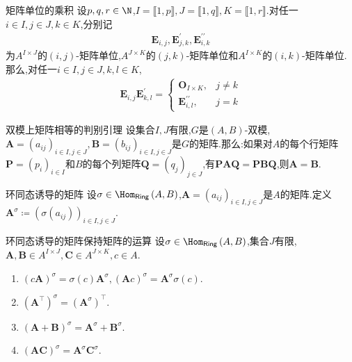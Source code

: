 \begin{proposition}{矩阵单位的乘积}{}
	设$p,q,r\in\N$,$I=\llbracket 1,p\rrbracket,J=\llbracket 1,q\rrbracket,K=\llbracket 1,r\rrbracket$.对任一$i\in I,j\in J,k\in K$,分别记
	\begin{align*}
		\boldsymbol{E}_{i,j},\boldsymbol{E}_{j,k}^{\prime},\boldsymbol{E}_{i,k}^{\prime\prime}
	\end{align*}
	为$A^{I\times J}$的$\left(i,j\right)$-矩阵单位,$A^{J\times K}$的$\left(j,k\right)$-矩阵单位和$A^{I\times K}$的$\left(i,k\right)$-矩阵单位.那么,对任一$i\in I,j\in J,k,l\in K$,
	\begin{align*}
		\boldsymbol{E}_{i,j}\boldsymbol{E}_{k,l}^{\prime}=
		\begin{cases}
			\boldsymbol{O}_{I\times K},&j\neq k\\
			\boldsymbol{E}_{i,l}^{\prime\prime},&j=k
		\end{cases}
	\end{align*}
\end{proposition}

\begin{proposition}{双模上矩阵相等的判别引理}{}
	设集合$I,J$有限,$G$是$\left(A,B\right)$-双模,$\boldsymbol{A}=\left(a_{ij}\right)_{i\in I,j\in J},\boldsymbol{B}=\left(b_{ij}\right)_{i\in I,j\in J}$是$G$的矩阵.那么:如果对$A$的每个行矩阵$\boldsymbol{P}=\left(p_{i}\right)_{i\in I}$和$B$的每个列矩阵$\boldsymbol{Q}=\left(q_{j}\right)_{j\in J}$,有$\boldsymbol{P}\boldsymbol{A}\boldsymbol{Q}=\boldsymbol{P}\boldsymbol{B}\boldsymbol{Q}$,则$\boldsymbol{A}=\boldsymbol{B}$.
\end{proposition}

\begin{definition}{环同态诱导的矩阵}{}
	设$\sigma\in\Hom_{\mathsf{Ring}}\left(A,B\right)$,$\boldsymbol{A}=\left(a_{ij}\right)_{i\in I,j\in J}$是$A$的矩阵.定义$\boldsymbol{A}^{\sigma}\coloneq\left(\sigma\left(a_{ij}\right)\right)_{i\in I,j\in J}$.
\end{definition}

\begin{proposition}{环同态诱导的矩阵保持矩阵的运算}{}
	设$\sigma\in\Hom_{\mathsf{Ring}}\left(A,B\right)$,集合$J$有限,$\boldsymbol{A},\boldsymbol{B}\in A^{I\times J},\boldsymbol{C}\in A^{J\times K},c\in A$.
	\begin{enumerate}
		\item $\left(c\boldsymbol{A}\right)^{\sigma}=\sigma\left(c\right)\boldsymbol{A}^{\sigma},\left(\boldsymbol{A}c\right)^{\sigma}=\boldsymbol{A}^{\sigma}\sigma\left(c\right)$.
		\item $\left(\boldsymbol{A}^{\top}\right)^{\sigma}=\left(\boldsymbol{A}^{\sigma}\right)^{\top}$.
		\item $\left(\boldsymbol{A}+\boldsymbol{B}\right)^{\sigma}=\boldsymbol{A}^{\sigma}+\boldsymbol{B}^{\sigma}$.
		\item $\left(\boldsymbol{A}\boldsymbol{C}\right)^{\sigma}=\boldsymbol{A}^{\sigma}\boldsymbol{C}^{\sigma}$.
	\end{enumerate}
\end{proposition}

